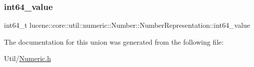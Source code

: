 \subsubsection{\texorpdfstring{int64\+\_\+value}{int64\_value}}
{\footnotesize\ttfamily int64\+\_\+t lucene\+::core\+::util\+::numeric\+::\+Number\+::\+Number\+Representation\+::int64\+\_\+value}



The documentation for this union was generated from the following file\+:\begin{DoxyCompactItemize}
\item 
Util/\mbox{\hyperlink{Numeric_8h}{Numeric.\+h}}\end{DoxyCompactItemize}
